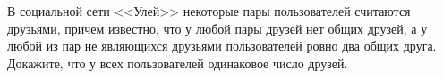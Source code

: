 \documentclass{article}
\begin{document}
В социальной сети <<Улей>> некоторые пары пользователей считаются друзьями, причем известно, что у любой пары друзей нет общих друзей, а у любой из пар не являющихся друзьями пользователей ровно два общих друга. Докажите, что у всех пользователей одинаковое число друзей.
\end{document}
